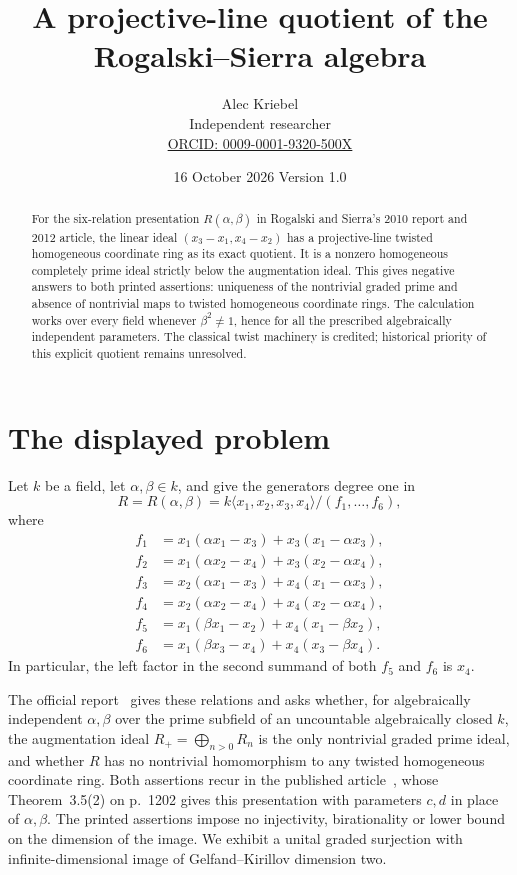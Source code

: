 \documentclass[11pt]{article}
\title{A projective-line quotient of the Rogalski--Sierra algebra}
\author{Alec Kriebel\\
\small Independent researcher\\
\small \href{https://orcid.org/0009-0001-9320-500X}{ORCID: 0009-0001-9320-500X}}
\date{16 October 2026 \quad Version 1.0}
\begin{document}
\maketitle
\begin{abstract}
For the six-relation presentation \(R(\alpha,\beta)\) in Rogalski and
Sierra's 2010 report and 2012 article, the linear ideal
\((x_3-x_1,x_4-x_2)\) has a projective-line twisted homogeneous coordinate
ring as its exact quotient. It is a nonzero homogeneous completely prime
ideal strictly below the augmentation ideal. This gives negative answers
to both printed assertions: uniqueness of the nontrivial graded prime
and absence of nontrivial maps to twisted homogeneous coordinate rings.
The calculation works over every field whenever \(\beta^2\ne1\), hence
for all the prescribed algebraically independent parameters.
The classical twist machinery is credited; historical priority of this
explicit quotient remains unresolved.
\end{abstract}

\section{The displayed problem}
Let \(k\) be a field, let \(\alpha,\beta\in k\), and give the generators
degree one in
\[
 R=R(\alpha,\beta)=k\langle x_1,x_2,x_3,x_4\rangle/(f_1,\ldots,f_6),
\]
where
\begin{align*}
 f_1&=x_1(\alpha x_1-x_3)+x_3(x_1-\alpha x_3),\\
 f_2&=x_1(\alpha x_2-x_4)+x_3(x_2-\alpha x_4),\\
 f_3&=x_2(\alpha x_1-x_3)+x_4(x_1-\alpha x_3),\\
 f_4&=x_2(\alpha x_2-x_4)+x_4(x_2-\alpha x_4),\\
 f_5&=x_1(\beta x_1-x_2)+x_4(x_1-\beta x_2),\\
 f_6&=x_1(\beta x_3-x_4)+x_4(x_3-\beta x_4).
\end{align*}
In particular, the left factor in the second summand of both \(f_5\)
and \(f_6\) is \(x_4\).

The official report~\cite[pp.~1361--1362]{OWR} gives these relations and
asks whether, for algebraically independent \(\alpha,\beta\) over the
prime subfield of an uncountable algebraically closed \(k\), the
augmentation ideal \(R_+=\bigoplus_{n>0}R_n\) is the only nontrivial
graded prime ideal, and whether \(R\) has no nontrivial homomorphism to
any twisted homogeneous coordinate ring. Both assertions recur in the
published article~\cite[p.~1198]{RS}, whose Theorem~3.5(2) on p.~1202
gives this presentation with parameters \(c,d\) in place of
\(\alpha,\beta\). The printed assertions impose no injectivity,
birationality or lower bound on the dimension of the image.
We exhibit a unital graded surjection with infinite-dimensional image
of Gelfand--Kirillov dimension two.
\end{document}
